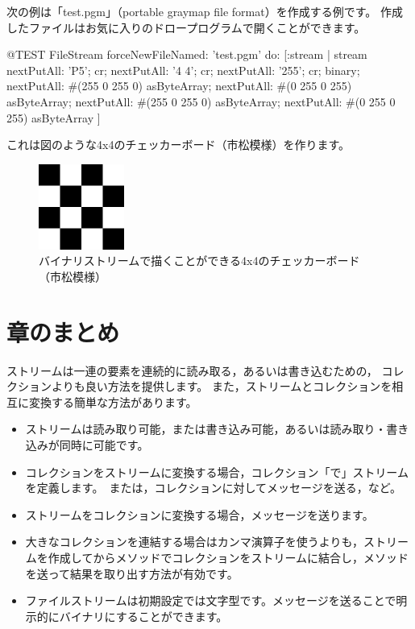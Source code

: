 \documentclass[a4paper,10pt,twoside]{book}
\begin{document}
次の例は「test.pgm」（portable graymap file format）を作成する例です。
作成したファイルはお気に入りのドロープログラムで開くことができます。


\begin{code}{@TEST}
FileStream
  forceNewFileNamed: 'test.pgm' 
  do: [:stream |
	stream
		nextPutAll: 'P5'; cr;
		nextPutAll: '4 4'; cr;
		nextPutAll: '255'; cr;
		binary;
		nextPutAll: #(255 0 255 0) asByteArray;
		nextPutAll: #(0 255 0 255) asByteArray;
		nextPutAll: #(255 0 255 0) asByteArray;
		nextPutAll: #(0 255 0 255) asByteArray
	]
\end{code}

これは図のような4x4のチェッカーボード（市松模様）を作ります。

\begin{figure}[!ht]
\centerline{\includegraphics[width=0.25\textwidth]{checkerboard4x4}}
\caption{バイナリストリームで描くことができる4x4のチェッカーボード（市松模様）}
\vspace{.2in}
\end{figure}

\section{章のまとめ}

ストリームは一連の要素を連続的に読み取る，あるいは書き込むための，
コレクションよりも良い方法を提供します。
また，ストリームとコレクションを相互に変換する簡単な方法があります。
\begin{itemize}
  \item ストリームは読み取り可能，または書き込み可能，あるいは読み取り・書き込みが同時に可能です。
  \item コレクションをストリームに変換する場合，コレクション「で」ストリームを定義します。\eg　または，コレクションに対してメッセージを送る，など。
  \item ストリームをコレクションに変換する場合，メッセージを送ります。
  \item 大きなコレクションを連結する場合はカンマ演算子を使うよりも，ストリームを作成してからメソッドでコレクションをストリームに結合し，メソッドを送って結果を取り出す方法が有効です。
  \item ファイルストリームは初期設定では文字型です。メッセージを送ることで明示的にバイナリにすることができます。
\end{itemize}

\ifx\wholebook\relax\else
\end{document}
